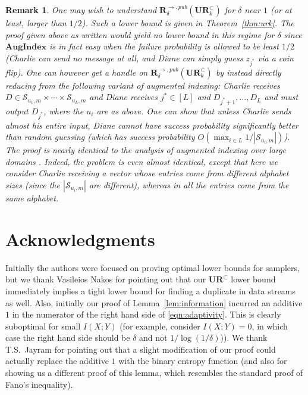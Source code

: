 \documentclass[11pt]{article}
\newtheorem{remark}{Remark}
\newcommand{\aug}{\mathbf{AugIndex}\xspace}
\newcommand{\ur}{\mathbf{UR}\xspace}
\newcommand{\randcom}{\mathbf{R}}
\begin{document}
\begin{remark}
\textup{
One may wish to understand $\randcom^{\rightarrow,pub}_\delta(\ur_k^\subset)$ for $\delta$ near $1$ (or at least, larger than $1/2$). Such a lower bound is given in Theorem~\ref{thm:urk}. The proof given above as written would yield no lower bound in this regime for $\delta$ since $\aug$ is in fact easy when the failure probability is allowed to be least $1/2$ (Charlie can send no message at all, and Diane can simply guess $z_{j^*}$ via a coin flip). One can however get a handle on $\randcom^{\rightarrow,pub}_\delta(\ur_k^\subset)$ by instead directly reducing from the following variant of augmented indexing: Charlie receives $D\in \mathcal S_{u_1,m}\times \cdots \times \mathcal S_{u_L, m}$ and Diane receives $j^*\in[L]$ and $D_{j^*+1},\ldots,D_L$ and must output $D_{j^*}$, where the $u_i$ are as above. One can show that unless Charlie sends almost his entire input, Diane cannot have success probability significantly better than random guessing (which has success probability $O(\max_{i\in L} 1/|\mathcal S_{u_i, m}|)$). The proof is nearly identical to the analysis of augmented indexing over large domains \cite{ErgunJS10,JayramW13}. Indeed, the problem is even almost identical, except that here we consider Charlie receiving a vector whose entries come from different alphabet sizes (since the $|\mathcal S_{u_i,m}|$ are different), whereas in \cite{ErgunJS10,JayramW13} all the entries come from the same alphabet.
}
\end{remark}

\section*{Acknowledgments}
Initially the authors were focused on proving optimal lower bounds for samplers, but we thank Vasileios Nakos for pointing out that our $\ur^\subset$ lower bound immediately implies a tight lower bound for finding a duplicate in data streams as well. Also, initially our proof of Lemma~\ref{lem:information} incurred an additive $1$ in the numerator of the right hand side of \eqref{eqn:adaptivity}. This is clearly suboptimal for small $I(X; Y)$ (for example, consider $I(X; Y) = 0$, in which case the right hand side should be $\delta$ and not $1/\log(1/\delta)$)). We thank T.S.\ Jayram for pointing out that a slight modification of our proof could actually replace the additive $1$ with the binary entropy function (and also for showing us a different proof of this lemma, which resembles the standard proof of Fano's inequality).
\end{document}
